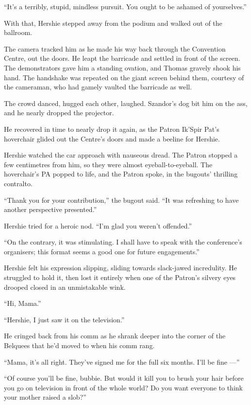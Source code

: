 ``It's a terribly, stupid, mindless pursuit. You ought to be ashamed of 
yourselves.''

With that, Hershie stepped away from the podium and walked out of
the ballroom.

\tb

The camera tracked him as he made his way back through the
Convention Centre, out the doors. He leapt the barricade and
settled in front of the screen. The demonstrators gave him a
standing ovation, and Thomas gravely shook his hand. The handshake
was repeated on the giant screen behind them, courtesy of the
cameraman, who had gamely vaulted the barricade as well.

The crowd danced, hugged each other, laughed. Szandor's dog bit him
on the ass, and he nearly dropped the projector.

He recovered in time to nearly drop it again, as the Patron Ik'Spir
Pat's hoverchair glided out the Centre's doors and made a beeline
for Hershie.

Hershie watched the car approach with nauseous dread. The Patron
stopped a few centimetres from him, so they were almost
eyeball-to-eyeball. The hoverchair's PA popped to life, and the
Patron spoke, in the bugouts' thrilling contralto.

``Thank you for your contribution,'' the bugout said.
``It was refreshing to have another perspective presented.''

Hershie tried for a heroic nod. ``I'm glad you weren't offended.''

``On the contrary, it was stimulating. I shall have to speak with the 
conference's organisers; this format seems a good one for future engagements.''

Hershie felt his expression slipping, sliding towards slack-jawed
incredulity. He struggled to hold it, then lost it entirely when
one of the Patron's silvery eyes drooped closed in an unmistakable
wink.

\tb

``Hi, Mama.''

``Hershie, I just saw it on the television.''

He cringed back from his comm as he shrank deeper into the corner
of the Belquees that he'd moved to when his comm rang.

``Mama, it's all right. They've signed me for the full six months. I'll be fine 
---''

``Of course you'll be fine, bubbie. But would it kill you to brush your hair 
before you go on television in front of the whole world? Do you want everyone 
to think your mother raised a slob?''

